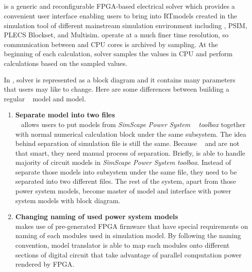 \subsection{\ehs}
\ehs is a generic and reconfigurable FPGA-based electrical solver which provides a convenient user interface enabling users to bring into \gls{RT}models created in the simulation tool of different mainstream simulation environment including \simulink, PSIM, PLECS Blockset, and Multisim. \ehs operate at a much finer time resolution, so communication between \ehs and \gls{CPU} cores is archived by sampling. At the beginning of each calculation, \ehs solver samples the values in \gls{CPU} and perform calculations based on the sampled values. 

In \simulink, \ehs solver is represented as a block diagram and it contains many parameters that users may like to change. Here are some differences between building a regular \rtlab~ model and \ehs model.
\begin{enumerate}
\item \textbf{Separate model into two files} \\
\rtlab~ allows users to put models from \textit{SimScape Power System \simulink~ toolbox} together with normal numerical calculation block under the same subsystem. The idea behind separation of simulation file is still the same. Because \rtlab~ and \ehs are not that smart, they need manual process of separation. Briefly, \ehs is able to handle majority of circuit models in \textit{SimScape Power System toolbox}. Instead of separate those models into subsystem under the same file, they need to be separated into two different files.  The rest of the system, apart from those power system models, become master of model and interface with power system models with \ehs block diagram. 
\item \textbf{Changing naming of used power system models} \\
\ehs makes use of pre-generated \gls{FPGA} firmware that have special requirements on naming of each modules used in simulation model. By following the naming convention, model translator is able to map each modules onto different sections of digital circuit that take advantage of parallel computation power rendered by \gls{FPGA}. 
\end{enumerate}

